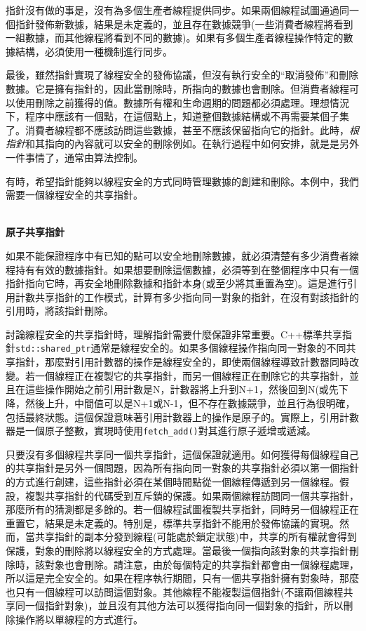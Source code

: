 指針沒有做的事是，沒有為多個生產者線程提供同步。如果兩個線程試圖通過同一個指針發佈新數據，結果是未定義的，並且存在數據競爭(一些消費者線程將看到一組數據，而其他線程將看到不同的數據)。如果有多個生產者線程操作特定的數據結構，必須使用一種機制進行同步。

最後，雖然指針實現了線程安全的發佈協議，但沒有執行安全的“取消發佈”和刪除數據。它是擁有指針的，因此當刪除時，所指向的數據也會刪除。但消費者線程可以使用刪除之前獲得的值。數據所有權和生命週期的問題都必須處理。理想情況下，程序中應該有一個點，在這個點上，知道整個數據結構或不再需要某個子集了。消費者線程都不應該訪問這些數據，甚至不應該保留指向它的指針。此時，\textit{根指針}和其指向的內容就可以安全的刪除例如。在執行過程中如何安排，就是是另外一件事情了，通常由算法控制。

有時，希望指針能夠以線程安全的方式同時管理數據的創建和刪除。本例中，我們需要一個線程安全的共享指針。

\hspace*{\fill} \\ %
\noindent
\textbf{原子共享指針}

如果不能保證程序中有已知的點可以安全地刪除數據，就必須清楚有多少消費者線程持有有效的數據指針。如果想要刪除這個數據，必須等到在整個程序中只有一個指針指向它時，再安全地刪除數據和指針本身(或至少將其重置為空)。這是進行引用計數共享指針的工作模式，計算有多少指向同一對象的指針，在沒有對該指針的引用時，將該指針刪除。

討論線程安全的共享指針時，理解指針需要什麼保證非常重要。C++標準共享指針\texttt{std::shared\_ptr}通常是線程安全的。如果多個線程操作指向同一對象的不同共享指針，那麼對引用計數器的操作是線程安全的，即使兩個線程導致計數器同時改變。若一個線程正在複製它的共享指針，而另一個線程正在刪除它的共享指針，並且在這些操作開始之前引用計數是N，計數器將上升到N+1，然後回到N(或先下降，然後上升，中間值可以是N+1或N-1，但不存在數據競爭，並且行為很明確，包括最終狀態。這個保證意味著引用計數器上的操作是原子的。實際上，引用計數器是一個原子整數，實現時使用\texttt{fetch\_add()}對其進行原子遞增或遞減。

只要沒有多個線程共享同一個共享指針，這個保證就適用。如何獲得每個線程自己的共享指針是另外一個問題，因為所有指向同一對象的共享指針必須以第一個指針的方式進行創建，這些指針必須在某個時間點從一個線程傳遞到另一個線程。假設，複製共享指針的代碼受到互斥鎖的保護。如果兩個線程訪問同一個共享指針，那麼所有的猜測都是多餘的。若一個線程試圖複製共享指針，同時另一個線程正在重置它，結果是未定義的。特別是，標準共享指針不能用於發佈協議的實現。然而，當共享指針的副本分發到線程(可能處於鎖定狀態)中，共享的所有權就會得到保護，對象的刪除將以線程安全的方式處理。當最後一個指向該對象的共享指針刪除時，該對象也會刪除。請注意，由於每個特定的共享指針都會由一個線程處理，所以這是完全安全的。如果在程序執行期間，只有一個共享指針擁有對象時，那麼也只有一個線程可以訪問這個對象。其他線程不能複製這個指針(不讓兩個線程共享同一個指針對象)，並且沒有其他方法可以獲得指向同一個對象的指針，所以刪除操作將以單線程的方式進行。

